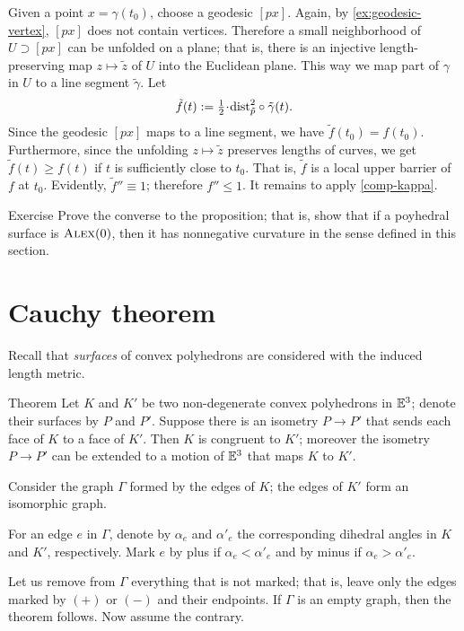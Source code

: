 Given a point $x=\gamma(t_0)$, choose a geodesic $[px]$.
Again, by \ref{ex:geodesic-vertex}, $[px]$ does not contain vertices.
Therefore a small neighborhood of $U\supset [px]$ can be unfolded on a plane;
that is, there is an injective length-preserving map $z\mapsto \tilde z$
of $U$ into the Euclidean plane.
This way we map part of $\gamma$ in $U$ to a line segment $\tilde\gamma$.
Let
\[\tilde f(t)\df\tfrac12\cdot\distfun_{\tilde p}^2\circ\tilde \gamma(t).\]
Since the geodesic $[px]$ maps to a line segment, we have $\tilde f(t_0)= f(t_0)$.
Furthermore, since the unfolding $z\mapsto \tilde z$ preserves lengths of curves, we get
$\tilde f(t)\ge f(t)$ if $t$ is sufficiently close to $t_0$.
That is, $\tilde f$ is a local upper barrier of $f$ at $t_0$.
Evidently, $\tilde f''\equiv 1$; therefore $f''\le 1$.
It remains to apply \ref{comp-kappa}.
\qeds

\begin{thm}{Exercise}\label{ex:poly-CBB}
Prove the converse to the proposition;
that is, show that if a poyhedral surface is $\textsc{Alex}(0)$, then it has nonnegative curvature in the sense defined in this section.
\end{thm}


\section{Cauchy theorem}

Recall that \textit{surfaces} of convex polyhedrons are considered with the induced length metric.
 
\begin{thm}{Theorem}\label{thm:cauchy} Let $K$ and $K'$ be two non-degenerate convex polyhedrons in $\mathbb{E}^3$;
denote their surfaces 
by $P$ and $P'$.
Suppose there is an isometry $P\to P'$ that sends each face of $K$ to a face of $K'$.
Then $K$ is congruent to $K'$; moreover the isometry $P\to P'$ can be extended to a motion of $\mathbb{E}^3$ that maps $K$  to $K'$.
\end{thm}

Consider the graph $\Gamma$ formed by the edges of $K$;
the edges of $K'$ form an isomorphic graph.
 
For an edge $e$ in $\Gamma$, denote by $\alpha_e$ and $\alpha'_e$ the corresponding dihedral angles in $K$ and $K'$, respectively.
Mark $e$ by plus if $\alpha_e < \alpha'_e$ and by minus if $\alpha_e > \alpha'_e$.

Let us remove from $\Gamma$ everything that is not marked;
that is, leave only the edges marked by $(+)$ or $(-)$ and their endpoints.
If $\Gamma$ is an empty graph, then the theorem follows.
Now assume the contrary.

